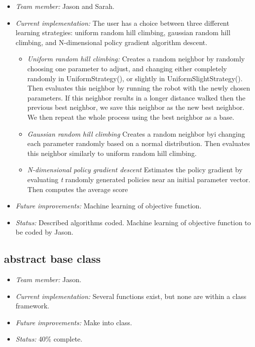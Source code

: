 \begin{itemize}
\item \emph{Team member:} Jason and Sarah.
\item \emph{Current implementation:} The user has a choice between three
  different learning strategies: uniform random hill climbing, gaussian random
  hill climbing, and N-dimensional policy gradient algorithm descent.
  \begin{itemize} 
  \item \emph{Uniform random hill climbing:} Creates a random neighbor by
  randomly choosing one parameter to adjust, and changing either
  completely randomly in UniformStrategy(), or slightly in
  UniformSlightStrategy(). Then evaluates this neighbor by running the robot
  with the newly chosen parameters. If this neighbor results in a
  longer distance walked then the previous best neighbor, we save this
  neighbor as the new best neighbor. We then repeat the whole process
  using the best neighbor as a base.
  \item \emph{Gaussian random hill climbing} Creates a random neighbor byi
  changing each parameter randomly based on a normal distribution. Then
  evaluates this neighbor similarly to uniform random hill climbing.
  \item \emph{N-dimensional policy gradient descent} Estimates the policy
  gradient by evaluating \emph{t} randomly generated policies
  near an initial parameter vector. Then computes the average score 
  \end{itemize}
\item \emph{Future improvements:} Machine learning of objective function.
\item \emph{Status:} Described algorithms coded. Machine learning of objective
  function to be coded by Jason.
\end{itemize}



\subsection*{ abstract base class}

\begin{itemize}
\item \emph{Team member:} Jason.
\item \emph{Current implementation:} Several functions exist, but none are within a class framework.
\item \emph{Future improvements:} Make into class.
\item \emph{Status:} 40\% complete.
\end{itemize}



